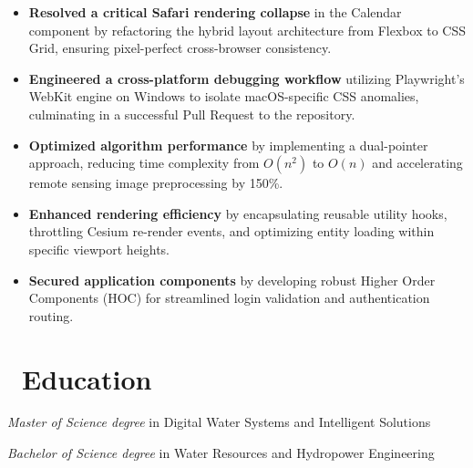 \documentclass{resume}
\begin{document}
\begin{itemize}
  \item \textbf{Resolved a critical Safari rendering collapse} in the Calendar component by refactoring the hybrid layout architecture from Flexbox to CSS Grid, ensuring pixel-perfect cross-browser consistency.
  \item \textbf{Engineered a cross-platform debugging workflow} utilizing Playwright's WebKit engine on Windows to isolate macOS-specific CSS anomalies, culminating in a successful Pull Request to the repository.
\end{itemize}

\begin{itemize}
  \item \textbf{Optimized algorithm performance} by implementing a dual-pointer approach, reducing time complexity from $O(n^2)$ to $O(n)$ and accelerating remote sensing image preprocessing by 150\%.
  \item \textbf{Enhanced rendering efficiency} by encapsulating reusable utility hooks, throttling Cesium re-render events, and optimizing entity loading within specific viewport heights.
  \item \textbf{Secured application components} by developing robust Higher Order Components (HOC) for streamlined login validation and authentication routing.
\end{itemize}

\section{\faGraduationCap\ Education}
\textit{Master of Science degree} in Digital Water Systems and Intelligent Solutions

\textit{Bachelor of Science degree} in Water Resources and Hydropower Engineering
\end{document}
